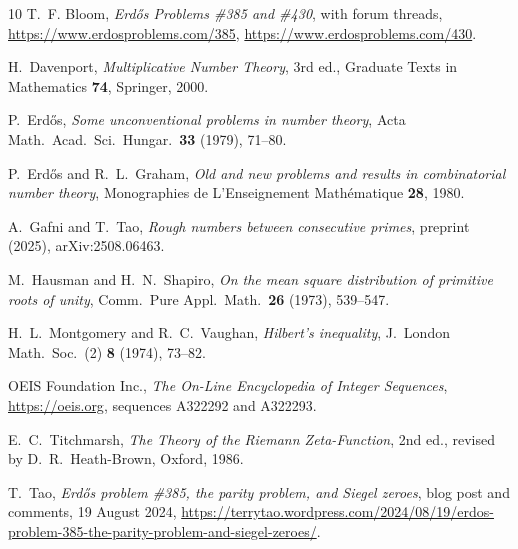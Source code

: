 \documentclass[11pt,letterpaper]{article}
\theoremstyle{remark}
\begin{document}
\begin{thebibliography}{10}
 T.~F. Bloom, \emph{Erd\H{o}s Problems \#385 and \#430}, with
forum threads, \url{https://www.erdosproblems.com/385},
\url{https://www.erdosproblems.com/430}.

 H.~Davenport, \emph{Multiplicative Number Theory},
3rd ed., Graduate Texts in Mathematics \textbf{74}, Springer, 2000.

 P.~Erd\H{o}s, \emph{Some unconventional problems in number
theory}, Acta Math.\ Acad.\ Sci.\ Hungar.\ \textbf{33} (1979), 71--80.

 P.~Erd\H{o}s and R.~L.~Graham, \emph{Old and new problems
and results in combinatorial number theory}, Monographies de
L'Enseignement Math\'ematique \textbf{28}, 1980.

 A.~Gafni and T.~Tao, \emph{Rough numbers between
consecutive primes}, preprint (2025), arXiv:2508.06463.

 M.~Hausman and H.~N.~Shapiro, \emph{On the mean square
distribution of primitive roots of unity}, Comm.\ Pure Appl.\ Math.\
\textbf{26} (1973), 539--547.

 H.~L.~Montgomery and R.~C.~Vaughan, \emph{Hilbert's
inequality}, J.\ London Math.\ Soc.\ (2) \textbf{8} (1974), 73--82.

 OEIS Foundation Inc., \emph{The On-Line Encyclopedia of Integer
Sequences}, \url{https://oeis.org}, sequences A322292 and A322293.

 E.~C.~Titchmarsh, \emph{The Theory of the Riemann
Zeta-Function}, 2nd ed., revised by D.~R.~Heath-Brown, Oxford, 1986.

 T.~Tao, \emph{Erd\H{o}s problem \#385, the parity problem, and
Siegel zeroes}, blog post and comments, 19 August 2024,
\url{https://terrytao.wordpress.com/2024/08/19/erdos-problem-385-the-parity-problem-and-siegel-zeroes/}.
\end{thebibliography}
\end{document}
